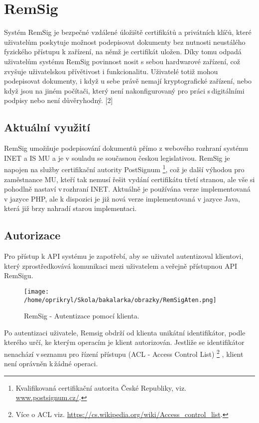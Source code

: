 \documentclass[]{fithesis3}
\begin{document}
\chapter{RemSig}

Systém RemSig je bezpečné vzdálené úložiště certifikátů a privátních klíčů, které uživatelům poskytuje možnost podepisovat dokumenty bez nutnosti neustálého fyzického přístupu k zařízení, na němž je certifikát uložen. Díky tomu odpadá uživatelům systému RemSig povinnost nosit s sebou hardwarové zařízení, což zvyšuje uživatelskou přívětivost i funkcionalitu. Uživatelé totiž mohou podepisovat dokumenty, i když u sebe právě nemají kryptografické zařízení, nebo když jsou na jiném počítači, který není nakonfigurovaný pro práci s\,digitálními podpisy nebo není důvěryhodný. [2]

	\section{Aktuální využití}

		RemSig umožňuje podepisování dokumentů přímo z webového rozhraní systému INET
		a IS MU a je v souladu se současnou českou legislativou. RemSig je napojen na služby 				certifikační autority PostSignum
	\footnote{Kvalifikovaná certifikační autorita České Republiky, viz. \url{www.postsignum.cz/}.}, 			což je další výhodou pro zaměstnance MU, kteří tak nemusí řešit vydání certifikátu třetí 			stranou, ale vše si pohodlně nastaví v\,rozhraní INET. Aktuálně je používána verze 					implementovaná v jazyce PHP, ale k dispozici je již nová verze implementovaná v jazyce 			Java, která již brzy nahradí starou implementaci. 
	
	\section{Autorizace} 

	Pro přístup k API systému je zapotřebí, aby se uživatel autentizoval klientovi, který 				zprostředkovává komunikaci mezi uživatelem a\,veřejně přístupnou API RemSigu.  
	\begin{figure}[!h]
  	\begin{minipage}{1.00\textwidth}
    		\texttt{[image: /home/oprikryl/Skola/bakalarka/obrazky/RemSigAten.png]}
  	\end{minipage}
 	\caption{RemSig - Autentizace pomocí klienta.}
  	\label{fig:RemSig - Autentizace pomocí klienta.}
	\end{figure}
	Po autentizaci uživatele, Remsig obdrží od klienta unikátní identifikátor, podle kterého určí, ke 		kterým operacím je klient autorizován. Jestliže se identifikátor nenachází v\,seznamu pro řízení 		přístupu (ACL - Access Control List)
	\footnote{Více o ACL viz. \url{https://cs.wikipedia.org/wiki/Access_control_list}.} , klient není oprávněn k\,žádné operaci.
\end{document}
